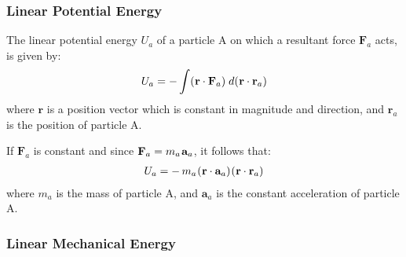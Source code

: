 \documentclass[10pt]{article}
\newcommand{\mM}{m}
\newcommand{\mU}{U}
\newcommand{\ra}{_a}
\newcommand{\vR}{\mathbf{r}}
\newcommand{\vA}{\mathbf{a}}
\newcommand{\vF}{\mathbf{F}}
\begin{document}
{\centering\subsubsection*{Linear Potential Energy}}

\vspace{+0.75em}

\par The linear potential energy $\mU\ra$ of a particle A on which a resultant force $\vF\ra$ acts, is given by:
\begin{eqnarray*}
\mU\ra = - \int (\hspace{+0.03em} \vR \cdot \vF\ra) \hspace{+0.27em} d(\hspace{+0.03em} \vR \cdot \vR\ra)
\end{eqnarray*}
\noindent where $\vR$ is a position vector which is constant in magnitude and direction, and $\vR\ra$ is the position of particle A.
\medskip
\par If $\vF\ra$ is constant and since $\vF\ra = \mM\ra \hspace{+0.09em} \vA\ra$, it follows that:
\begin{eqnarray*}
\mU\ra = - \hspace{+0.18em} \mM\ra \hspace{+0.06em} (\hspace{+0.03em} \vR \cdot \vA\ra) \hspace{+0.06em} (\hspace{+0.03em} \vR \cdot \vR\ra)
\end{eqnarray*}
\noindent where $\mM\ra$ is the mass of particle A, and $\vA\ra$ is the constant acceleration of particle A.

\vspace{+0.75em}

{\centering\subsubsection*{Linear Mechanical Energy}}

\vspace{+0.75em}
\end{document}
